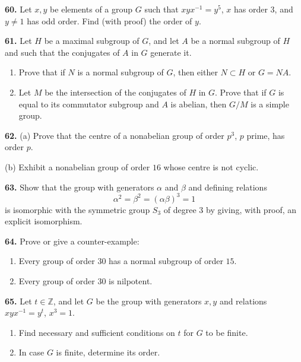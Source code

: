 \documentclass[a4paper,11pt,final]{memoir}%
\theoremstyle{nonumberplain}
\begin{document}
\medskip\noindent\textbf{60.} Let $x,y$ be elements of a group $G$ such that
$xyx^{-1}=y^{5}$, $x$ has order $3$, and $y\neq1$ has odd order. Find (with
proof) the order of $y$.

\medskip\noindent\textbf{61.} Let $H$ be a maximal subgroup of $G$, and let
$A$ be a normal subgroup of $H$ and such that the conjugates of $A$ in $G$
generate it.

\begin{enumerate}
\item Prove that if $N$ is a normal subgroup of $G$, then either $N\subset H$
or $G=NA$.

\item Let $M$ be the intersection of the conjugates of $H$ in $G$. Prove that
if $G$ is equal to its commutator subgroup and $A$ is abelian, then $G/M $ is
a simple group.
\end{enumerate}

\medskip\noindent\textbf{62.} (a) Prove that the centre of a nonabelian group
of order $p^{3}$, $p$ prime, has order $p$.

\noindent(b) Exhibit a nonabelian group of order $16$ whose centre is not cyclic.

\medskip\noindent\textbf{63.} Show that the group with generators $\alpha$ and
$\beta$ and defining relations
\[
\alpha^{2}=\beta^{2}=(\alpha\beta)^{3}=1
\]
is isomorphic with the symmetric group $S_{3}$ of degree $3$ by giving, with
proof, an explicit isomorphism.

\medskip\noindent\textbf{64.} Prove or give a counter-example:

\begin{enumerate}
\item Every group of order $30$ has a normal subgroup of order $15$.

\item Every group of order $30$ is nilpotent.
\end{enumerate}

\medskip\noindent\textbf{65.} Let $t\in\mathbb{Z}$, and let $G$ be the group
with generators $x,y$ and relations $xyx^{-1}=y^{t}$, $x^{3}=1$.

\begin{enumerate}
\item Find necessary and sufficient conditions on $t$ for $G$ to be finite.

\item In case $G$ is finite, determine its order.
\end{enumerate}
\end{document}
